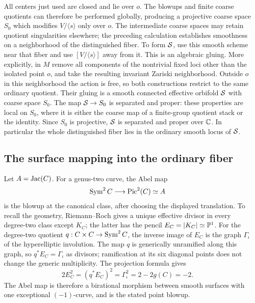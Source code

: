 All centers just used are closed and lie over $o$.  The blowups and
finite coarse quotients can therefore be performed globally,
producing a projective coarse space $S_0$ which modifies
$V/\langle s\rangle$ only over $o$.  The intermediate coarse spaces
may retain quotient singularities elsewhere; the preceding calculation
establishes smoothness on a neighborhood of the distinguished fiber.
To form $\mathcal S$, use this smooth scheme near that fiber and use
$[V/\langle s\rangle]$ away from it.  This is an algebraic gluing.
More explicitly, in $M$ remove all components of the nontrivial fixed
loci other than the isolated point $o$, and take the resulting invariant
Zariski neighborhood.  Outside $o$ in this neighborhood the action is
free, so both constructions restrict to the same ordinary quotient.
Their gluing is a smooth connected effective orbifold $\mathcal S$ with
coarse space $S_0$.  The map $\mathcal S\to S_0$ is separated and proper:
these properties are local on $S_0$, where it is either the coarse map of a finite-group
quotient stack or the identity.  Since $S_0$ is projective,
$\mathcal S$ is separated and proper over $\mathbb C$.  In particular the whole distinguished
fiber lies in the ordinary smooth locus of $\mathcal S$.

\subsection{The surface mapping into the ordinary fiber}\label{geo:surface}

Let $A=\operatorname{Jac}(C)$.  For a genus-two curve, the Abel map
\[
        \operatorname{Sym}^2C\longrightarrow\operatorname{Pic}^2(C)\simeq A
\]
is the blowup at the canonical class, after choosing the displayed
translation.  To recall the geometry, Riemann--Roch gives a unique
effective divisor in every degree-two class except $K_C$; the latter
has the pencil $E_C=|K_C|\simeq\mathbb P^1$.  For the degree-two quotient
$q:C\times C\to\operatorname{Sym}^2 C$, the inverse image of $E_C$ is the graph
$\Gamma_\iota$ of the hyperelliptic involution.  The map $q$ is generically
unramified along this graph, so $q^*E_C=\Gamma_\iota$ as divisors;
ramification at its six diagonal points does not change the generic
multiplicity.  The projection formula gives
\[
  2E_C^2=(q^*E_C)^2=\Gamma_\iota^2=2-2g(C)=-2.
\]
The Abel map is therefore a birational
morphism between smooth surfaces with one exceptional $(-1)$-curve,
and is the stated point blowup.

